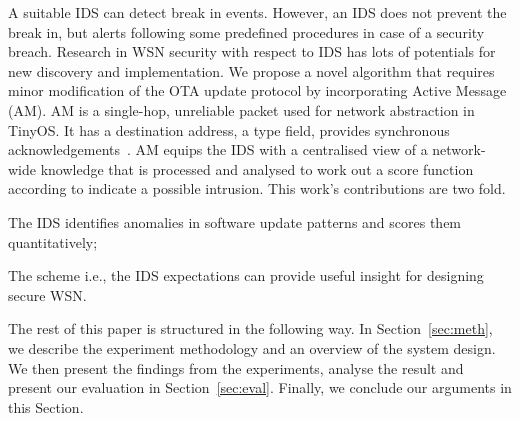 \documentclass[conference,manuscript]{IEEEtran}
\begin{document}
A suitable IDS can detect  break in events. 
However, an IDS does not prevent the break in, but alerts following some predefined procedures in case of a security breach.
Research in WSN security with respect to IDS has lots of potentials for new discovery and implementation. 
We propose a novel algorithm that requires minor modification of the OTA update protocol by incorporating Active Message (AM). 
AM is a single-hop, unreliable packet used for network abstraction in TinyOS. 
It has a destination address, a type field, provides synchronous acknowledgements~\cite{tep116}. 
AM equips the IDS with a centralised view of a network-wide knowledge that is processed and analysed to work out a score function according to indicate a possible intrusion.
This work's contributions are two fold.
\begin{inparaenum}
\item  The IDS identifies anomalies in software update patterns and scores them quantitatively;
\item The scheme i.e., the IDS expectations can provide useful insight for designing secure WSN.
\end{inparaenum}


The rest of this paper is structured in the following way. 
In Section~\ref{sec:meth}, we describe the experiment methodology and an overview of the system  design. 
We then present the findings from the experiments, analyse the result and present our evaluation in Section~\ref{sec:eval}.  
Finally, we conclude our arguments in this Section.
\end{document}
